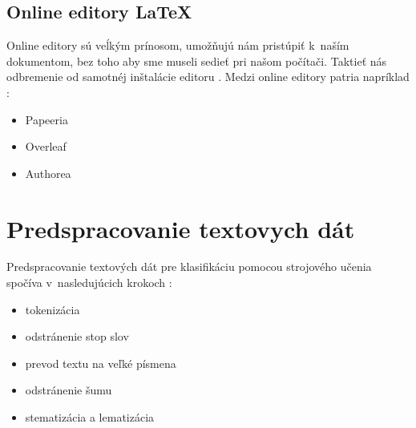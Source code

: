 \documentclass[a4paper, 11pt]{article}
\begin{document}
\subsection{Online editory \LaTeX}
Online editory sú veĺkým prínosom, umožňujú nám pristúpiť k~naším dokumentom, bez toho aby sme museli
sedieť pri našom počítači. Taktieť nás odbremenie od samotnéj inštalácie editoru
\cite{diplomka_online_editory}. Medzi online editory patria napríklad \cite{latex_example_editors}:

\begin{itemize}
    \item Papeeria
    \item Overleaf
    \item Authorea
\end{itemize}

\section{Predspracovanie textovych dát}
Predspracovanie textových dát pre klasifikáciu pomocou strojového učenia spočíva v~nasledujúcich krokoch \cite{classification}:

\begin{itemize}
    \item tokenizácia
    \item odstránenie stop slov
    \item prevod textu na veľké písmena
    \item odstránenie šumu
    \item stematizácia a lematizácia
\end{itemize}

\newpage
\renewcommand{\refname}{Literatúra}

\end{document}
